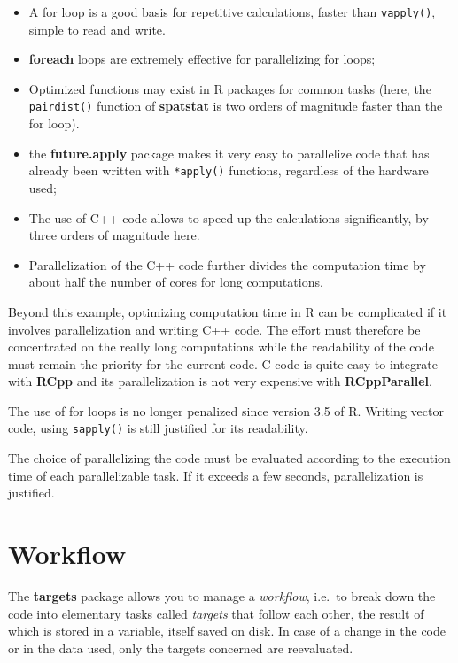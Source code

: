 \documentclass[
  12pt,
  american,
  a4paper,
  extrafontsizes,onecolumn,openright
  ]{memoir}
\providecommand{\tightlist}{%
  \setlength{\itemsep}{0pt}\setlength{\parskip}{0pt}}
\begin{document}
\begin{itemize}
\tightlist
\item
  A for loop is a good basis for repetitive calculations, faster than \texttt{vapply()}, simple to read and write.
\item
  \textbf{foreach} loops are extremely effective for parallelizing for loops;
\item
  Optimized functions may exist in R packages for common tasks (here, the \texttt{pairdist()} function of \textbf{spatstat} is two orders of magnitude faster than the for loop).
\item
  the \textbf{future.apply} package makes it very easy to parallelize code that has already been written with \texttt{*apply()} functions, regardless of the hardware used;
\item
  The use of C++ code allows to speed up the calculations significantly, by three orders of magnitude here.
\item
  Parallelization of the C++ code further divides the computation time by about half the number of cores for long computations.
\end{itemize}

Beyond this example, optimizing computation time in R can be complicated if it involves parallelization and writing C++ code.
The effort must therefore be concentrated on the really long computations while the readability of the code must remain the priority for the current code.
C code is quite easy to integrate with \textbf{RCpp} and its parallelization is not very expensive with \textbf{RCppParallel}.

The use of for loops is no longer penalized since version 3.5 of R.
Writing vector code, using \texttt{sapply()} is still justified for its readability.

The choice of parallelizing the code must be evaluated according to the execution time of each parallelizable task.
If it exceeds a few seconds, parallelization is justified.

\section{Workflow}\label{sec:targets}

The \textbf{targets} package allows you to manage a \emph{workflow}, i.e.~to break down the code into elementary tasks called \emph{targets} that follow each other, the result of which is stored in a variable, itself saved on disk.
In case of a change in the code or in the data used, only the targets concerned are reevaluated.
\end{document}
